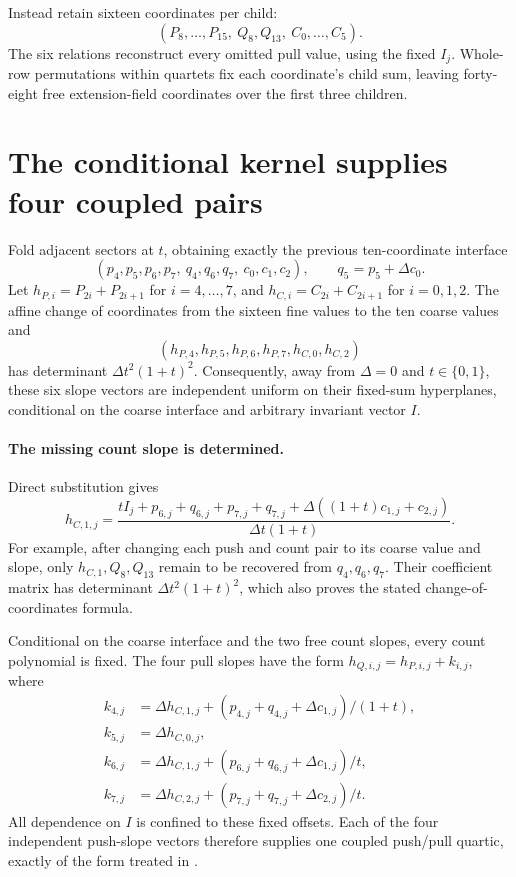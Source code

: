 \documentclass[11pt]{article}
\begin{document}
Instead retain sixteen coordinates per child:
\[
 (P_8,\ldots,P_{15},\ Q_8,Q_{13},\ C_0,\ldots,C_5).
\]
The six relations reconstruct every omitted pull value, using the fixed $I_j$. Whole-row permutations within quartets fix each coordinate's child sum, leaving forty-eight free extension-field coordinates over the first three children.

\section{The conditional kernel supplies four coupled pairs}

Fold adjacent sectors at $t$, obtaining exactly the previous ten-coordinate interface
\[
 (p_4,p_5,p_6,p_7,\ q_4,q_6,q_7,\ c_0,c_1,c_2),
 \qquad q_5=p_5+\Delta c_0.
\]
Let $h_{P,i}=P_{2i}+P_{2i+1}$ for $i=4,\ldots,7$, and $h_{C,i}=C_{2i}+C_{2i+1}$ for $i=0,1,2$. The affine change of coordinates from the sixteen fine values to the ten coarse values and
\[
 (h_{P,4},h_{P,5},h_{P,6},h_{P,7},h_{C,0},h_{C,2})
\]
has determinant $\Delta t^2(1+t)^2$. Consequently, away from $\Delta=0$ and $t\in\{0,1\}$, these six slope vectors are independent uniform on their fixed-sum hyperplanes, conditional on the coarse interface and arbitrary invariant vector $I$.

\paragraph{The missing count slope is determined.} Direct substitution gives
\[
 h_{C,1,j}=\frac{tI_j+p_{6,j}+q_{6,j}+p_{7,j}+q_{7,j}
             +\Delta((1+t)c_{1,j}+c_{2,j})}{\Delta t(1+t)}.
\]
For example, after changing each push and count pair to its coarse value and slope, only $h_{C,1},Q_8,Q_{13}$ remain to be recovered from $q_4,q_6,q_7$. Their coefficient matrix has determinant $\Delta t^2(1+t)^2$, which also proves the stated change-of-coordinates formula.

Conditional on the coarse interface and the two free count slopes, every count polynomial is fixed. The four pull slopes have the form $h_{Q,i,j}=h_{P,i,j}+k_{i,j}$, where
\[
\begin{aligned}
 k_{4,j}&=\Delta h_{C,1,j}+(p_{4,j}+q_{4,j}+\Delta c_{1,j})/(1+t),\\
 k_{5,j}&=\Delta h_{C,0,j},\\
 k_{6,j}&=\Delta h_{C,1,j}+(p_{6,j}+q_{6,j}+\Delta c_{1,j})/t,\\
 k_{7,j}&=\Delta h_{C,2,j}+(p_{7,j}+q_{7,j}+\Delta c_{2,j})/t.
\end{aligned}
\]
All dependence on $I$ is confined to these fixed offsets. Each of the four independent push-slope vectors therefore supplies one coupled push/pull quartic, exactly of the form treated in .
\end{document}
